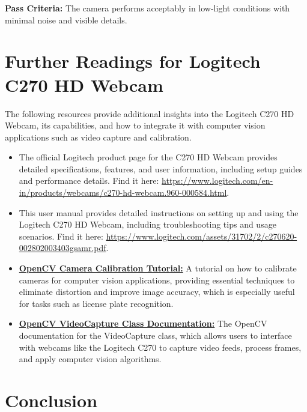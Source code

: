 \textbf{Pass Criteria:} 
The camera performs acceptably in low-light conditions with minimal noise and visible details.

\section{Further Readings for Logitech C270 HD Webcam}

The following resources provide additional insights into the Logitech C270 HD Webcam, its capabilities, and how to integrate it with computer vision applications such as video capture and calibration.

\begin{itemize}
	\item 	The official Logitech product page for the C270 HD Webcam provides detailed specifications, features, and user information, including setup guides and performance details. Find it here:  
	\href{https://www.logitech.com/en-in/products/webcams/c270-hd-webcam.960-000584.html}{https://www.logitech.com/en-in/products/webcams/c270-hd-webcam.960-000584.html}.
	

	
	\item This user manual provides detailed instructions on setting up and using the Logitech C270 HD Webcam, including troubleshooting tips and usage scenarios. Find it here:  
	\href{https://www.logitech.com/assets/31702/2/c270620-002802003403gsamr.pdf}{https://www.logitech.com/assets/31702/2/c270620-002802003403gsamr.pdf}.
	
	
	\item \textbf{\href{https://docs.opencv.org/4.x/dc/dbb/tutorial_py_calibration.html}{OpenCV Camera Calibration Tutorial:}}  
	A tutorial on how to calibrate cameras for computer vision applications, providing essential techniques to eliminate distortion and improve image accuracy, which is especially useful for tasks such as license plate recognition.
	
	\item \textbf{\href{https://docs.opencv.org/3.4/d8/dfe/classcv_1_1VideoCapture.html}{OpenCV VideoCapture Class Documentation:}}  
	The OpenCV documentation for the VideoCapture class, which allows users to interface with webcams like the Logitech C270 to capture video feeds, process frames, and apply computer vision algorithms.
\end{itemize}

\section{Conclusion}

